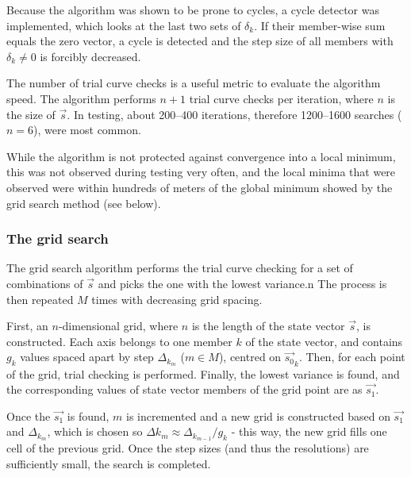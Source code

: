 Because the algorithm was shown to be prone to cycles, a cycle detector was implemented, which looks at the last two sets of $\delta_k$. If their member-wise sum equals the zero vector, a cycle is detected and the step size of all members with $\delta_k \not= 0$ is forcibly decreased.

The number of trial curve checks is a useful metric to evaluate the algorithm speed. The algorithm performs $n+1$ trial curve checks per iteration, where $n$ is the size of $\Vec{s}$. In testing, about \numrange{200}{400} iterations, therefore \numrange{1200}{1600} searches ($n = 6$), were most common.

While the algorithm is not protected against convergence into a local minimum, this was not observed during testing very often, and the local minima that were observed were within hundreds of meters of the global minimum showed by
the grid search method (see below).

\subsubsection{The grid search}
The grid search algorithm performs the trial curve checking for a set of combinations of $\Vec{s}$ and picks the one with the lowest variance.n%
The process is then repeated $M$ times with decreasing grid spacing.

First, an $n$-dimensional grid, where $n$ is the length of the state vector $\Vec{s}$, is constructed. Each axis belongs to one member $k$ of the state vector, and contains $g_k$ values spaced apart by step $\Delta_{k_m}$ ($m \in M$), centred on $\Vec{s_0}_k$. Then, for each point of the grid, trial checking is performed. Finally, the lowest variance is found, and the corresponding values of state vector members of the grid point are as $\Vec{s_1}$.

Once the $\Vec{s_1}$ is found, $m$ is incremented and a new grid is constructed based on $\Vec{s_1}$ and $\Delta_{k_m}$, which is chosen so $\Delta{k_{m}} \approx \Delta_{k_{m-1}} / g_k$ - this way, the new grid fills one cell of the previous grid. Once the step sizes (and thus the resolutions) are sufficiently small, the search is completed.

